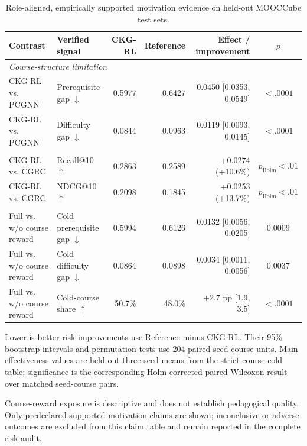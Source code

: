 \begin{table}[t]
\centering
\begin{threeparttable}
\caption{Role-aligned, empirically supported motivation evidence on held-out MOOCCube test sets.}
\label{tab:p1-motivation-evidence}
\footnotesize
\setlength{\tabcolsep}{4.5pt}
\begin{tabular*}{\textwidth}{@{\extracolsep{\fill}}llrrrc}
\toprule
Contrast & Verified signal & CKG-RL & Reference & Effect / improvement & $p$ \\
\midrule
\multicolumn{6}{l}{\textit{Course-structure limitation}} \\
CKG-RL vs. PCGNN & Prerequisite gap $\downarrow$ & 0.5977 & 0.6427 & 0.0450 [0.0353, 0.0549] & $<.0001$ \\
CKG-RL vs. PCGNN & Difficulty gap $\downarrow$ & 0.0844 & 0.0963 & 0.0119 [0.0093, 0.0145] & $<.0001$ \\
\addlinespace[1pt]
\multicolumn{6}{l}{\textit{Strict cold-start effectiveness}} \\
CKG-RL vs. CGRC & Recall@10 $\uparrow$ & 0.2863 & 0.2589 & +0.0274 (+10.6\%) & $p_{\mathrm{Holm}}<.01$ \\
CKG-RL vs. CGRC & NDCG@10 $\uparrow$ & 0.2098 & 0.1845 & +0.0253 (+13.7\%) & $p_{\mathrm{Holm}}<.01$ \\
\addlinespace[1pt]
\multicolumn{6}{l}{\textit{Course-reward mechanism}} \\
Full vs. w/o course reward & Cold prerequisite gap $\downarrow$ & 0.5994 & 0.6126 & 0.0132 [0.0056, 0.0205] & $0.0009$ \\
Full vs. w/o course reward & Cold difficulty gap $\downarrow$ & 0.0864 & 0.0898 & 0.0034 [0.0011, 0.0056] & $0.0037$ \\
Full vs. w/o course reward & Cold-course share $\uparrow$ & 50.7\% & 48.0\% & +2.7 pp [1.9, 3.5] & $<.0001$ \\
\bottomrule
\end{tabular*}
\begin{tablenotes}[flushleft]
\scriptsize
\item Lower-is-better risk improvements use Reference minus CKG-RL. Their 95\% bootstrap intervals and permutation tests use 204 paired seed-course units. Main effectiveness values are held-out three-seed means from the strict course-cold table; significance is the corresponding Holm-corrected paired Wilcoxon result over matched seed-course pairs.
\item Course-reward exposure is descriptive and does not establish pedagogical quality. Only predeclared supported motivation claims are shown; inconclusive or adverse outcomes are excluded from this claim table and remain reported in the complete risk audit.
\end{tablenotes}
\end{threeparttable}
\end{table}
